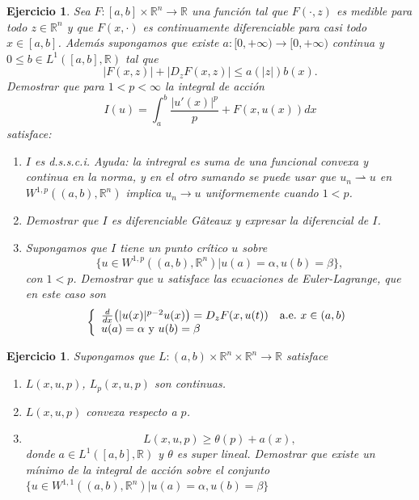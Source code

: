 \documentclass{article}
\newcounter{ejer}
\newtheorem{ejercicio}[ejer]{Ejercicio}}
\newcommand{\rr}{\mathbb{R}}
\begin{document}
\begin{ejercicio} Sea $F:[a,b]\times \rr^n\to\rr$ una función tal que $F(\cdot,z)$ es medible para todo $z\in\rr^n$ y que $F(x,\cdot)$ es continuamente diferenciable para casi todo $x\in [a,b]$. Además supongamos que existe $a:[0,+\infty)\to [0,+\infty)$ continua y $0\leq b\in  L^1([a,b],\rr)$ tal que
\[|F(x,z)|+|D_{z}F(x,z)|\leq a(|z|)b(x).\]
Demostrar que para $1< p<\infty$ la integral de acción
\[I(u)=\int_a^b\frac{|u'(x)|^p}{p}+F(x,u(x))dx\]
satisface:
\begin{enumerate}
 \item $I$ es d.s.s.c.i. \emph{Ayuda:}   la intregral es suma de una funcional convexa y continua en la norma, y en el otro sumando se puede usar que $u_n\rightharpoonup u$ en $W^{1,p}((a,b),\rr^n)$ implica $u_n\to u$ uniformemente cuando $1<p$.

 \item Demostrar que $I$ es diferenciable G\^ateaux y expresar la diferencial de $I$.

 \item Supongamos que $I$ tiene un punto crítico $u$ sobre
 \[\{u\in W^{1,p}((a,b),\rr^n)| u(a)=\alpha, u(b)=\beta\},\]
 con $1<p$. Demostrar que $u$ satisface las ecuaciones de  Euler-Lagrange, que en este caso son
 \begin{equation}\label{ProbPrin}
    \left\{%
\begin{array}{ll}
   \frac{d}{dx}\big(|u(x)|^{p-2}u(x)\big)= D_zF(x,u(t)) \quad \hbox{a.e.}\ x \in (a,b)\\
    u(a)=\alpha\text{ y } u(b)=\beta\\
\end{array}%
\right.
\end{equation}

 \end{enumerate}


\end{ejercicio}




\begin{ejercicio} Supongamos que $L:(a,b)\times\rr^n\times\rr^n\to\rr$ satisface
\begin{enumerate}
 \item $L(x,u,p)$, $L_p(x,u,p)$ son continuas.
 \item $L(x,u,p)$ convexa respecto a $p$.
 \item \[L(x,u,p)\geq \theta(p)+a(x),\]
 donde $a\in L^1([a,b],\rr)$ y $\theta$ es super lineal. Demostrar que existe un mínimo de la integral de acción sobre el conjunto $\{u\in W^{1,1}((a,b),\rr^n)| u(a)=\alpha, u(b)=\beta\}$
\end{enumerate}


\end{ejercicio}
\end{document}
